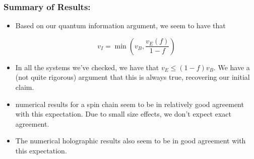 \documentclass[10pt,aspectratio=169]{beamer}
\begin{document}
\begin{frame}
\frametitle{Summary of Results:}

\begin{itemize}

\item Based on our quantum information argument, we seem to have that

\begin{equation}
v_I = \min \left( v_B, \frac{v_E(f)}{1-f} \right)
\end{equation}

\item In all the systems we've checked, we have that $v_E \leq (1-f) v_B$. We have a (not quite rigorous) argument that this is always true, recovering our initial claim.

\item numerical results for a spin chain seem to be in relatively good agreement with this expectation. Due to small size effects, we don't expect exact agreement.

\item The numerical holographic results also seem to be in good agreement with this expectation.
 

\end{itemize}

\end{frame}
\end{document}

